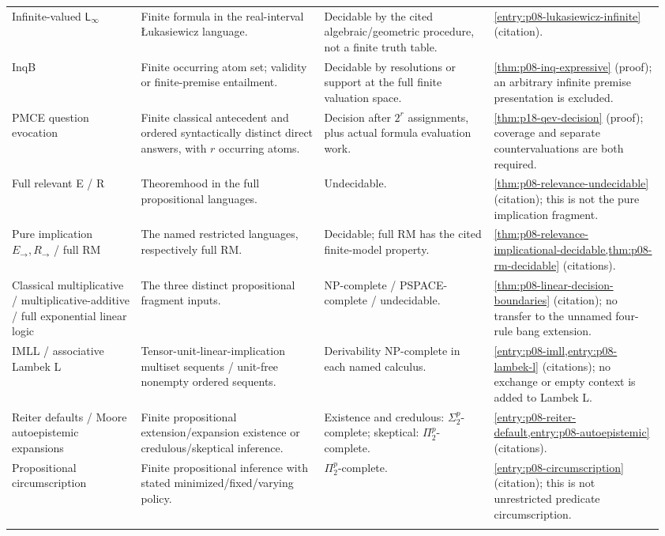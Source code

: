 \begin{landscape}
\begin{longtable}{@{}p{0.19\linewidth}p{0.27\linewidth}p{0.25\linewidth}p{0.25\linewidth}@{}}
Infinite-valued \(\mathsf L_\infty\) & Finite formula in the real-interval \L{}ukasiewicz language. & Decidable by the cited algebraic/geometric procedure, not a finite truth table. & \cref{entry:p08-lukasiewicz-infinite} (citation).\\\addlinespace
InqB & Finite occurring atom set; validity or finite-premise entailment. & Decidable by resolutions or support at the full finite valuation space. & \cref{thm:p08-inq-expressive} (proof); an arbitrary infinite premise presentation is excluded.\\\addlinespace
PMCE question evocation & Finite classical antecedent and ordered syntactically distinct direct answers, with \(r\) occurring atoms. & Decision after \(2^r\) assignments, plus actual formula evaluation work. & \cref{thm:p18-qev-decision} (proof); coverage and separate countervaluations are both required.\\\addlinespace
Full relevant E / R & Theoremhood in the full propositional languages. & Undecidable. & \cref{thm:p08-relevance-undecidable} (citation); this is not the pure implication fragment.\\\addlinespace
Pure implication \(E_\to,R_\to\) / full RM & The named restricted languages, respectively full RM. & Decidable; full RM has the cited finite-model property. & \cref{thm:p08-relevance-implicational-decidable,thm:p08-rm-decidable} (citations).\\\addlinespace
Classical multiplicative / multiplicative-additive / full exponential linear logic & The three distinct propositional fragment inputs. & NP-complete / PSPACE-complete / undecidable. & \cref{thm:p08-linear-decision-boundaries} (citation); no transfer to the unnamed four-rule bang extension.\\\addlinespace
IMLL / associative Lambek L & Tensor-unit-linear-implication multiset sequents / unit-free nonempty ordered sequents. & Derivability NP-complete in each named calculus. & \cref{entry:p08-imll,entry:p08-lambek-l} (citations); no exchange or empty context is added to Lambek L.\\\addlinespace
Reiter defaults / Moore autoepistemic expansions & Finite propositional extension/expansion existence or credulous/skeptical inference. & Existence and credulous: \(\Sigma_2^p\)-complete; skeptical: \(\Pi_2^p\)-complete. & \cref{entry:p08-reiter-default,entry:p08-autoepistemic} (citations).\\\addlinespace
Propositional circumscription & Finite propositional inference with stated minimized/fixed/varying policy. & \(\Pi_2^p\)-complete. & \cref{entry:p08-circumscription} (citation); this is not unrestricted predicate circumscription.\\\addlinespace
\end{longtable}
\endgroup
\end{landscape}

